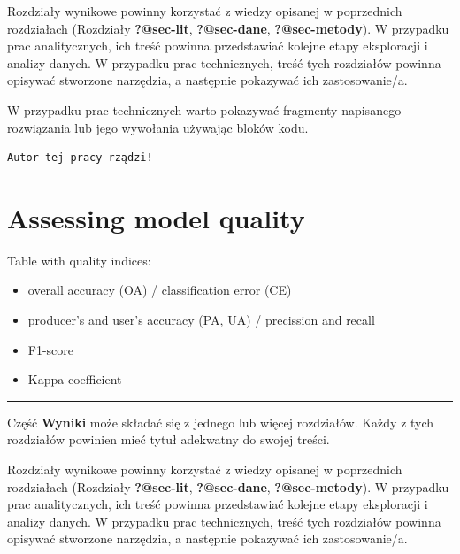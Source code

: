 \documentclass{amuthesis}
\begin{document}
Rozdziały wynikowe powinny korzystać z wiedzy opisanej w poprzednich
rozdziałach (Rozdziały \textbf{?@sec-lit}, \textbf{?@sec-dane},
\textbf{?@sec-metody}). W przypadku prac analitycznych, ich treść
powinna przedstawiać kolejne etapy eksploracji i analizy danych. W
przypadku prac technicznych, treść tych rozdziałów powinna opisywać
stworzone narzędzia, a następnie pokazywać ich zastosowanie/a.

W przypadku prac technicznych warto pokazywać fragmenty napisanego
rozwiązania lub jego wywołania używając bloków kodu.

\begin{Shaded}
\begin{Highlighting}[]
\OtherTok{=} 
  \NormalTok{)}
\NormalTok{\}}
\NormalTok{(}\NormalTok{)}
\end{Highlighting}
\end{Shaded}

\begin{verbatim}
Autor tej pracy rządzi!
\end{verbatim}


\hypertarget{sec-results-eval}{%
\chapter{Assessing model quality}\label{sec-results-eval}}

Table with quality indices:

\begin{itemize}
\item
  overall accuracy (OA) / classification error (CE)
\item
  producer's and user's accuracy (PA, UA) / precission and recall
\item
  F1-score
\item
  Kappa coefficient
\end{itemize}

\begin{center}\rule{0.5\linewidth}{0.5pt}\end{center}

Część \textbf{Wyniki} może składać się z jednego lub więcej rozdziałów.
Każdy z tych rozdziałów powinien mieć tytuł adekwatny do swojej treści.

Rozdziały wynikowe powinny korzystać z wiedzy opisanej w poprzednich
rozdziałach (Rozdziały \textbf{?@sec-lit}, \textbf{?@sec-dane},
\textbf{?@sec-metody}). W przypadku prac analitycznych, ich treść
powinna przedstawiać kolejne etapy eksploracji i analizy danych. W
przypadku prac technicznych, treść tych rozdziałów powinna opisywać
stworzone narzędzia, a następnie pokazywać ich zastosowanie/a.
\end{document}
